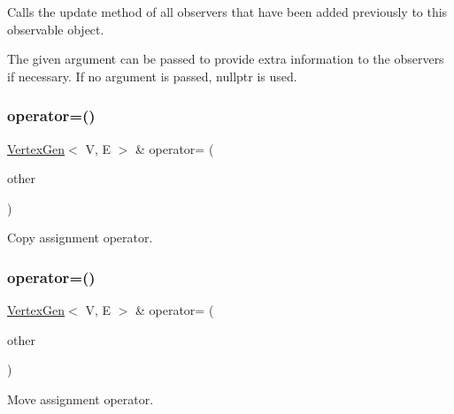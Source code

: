 Calls the update method of all observers that have been added previously to this observable object. 

The given argument can be passed to provide extra information to the observers if necessary. If no argument is passed, nullptr is used. \mbox{\label{classVertexGen_aa22afb123ae6fddef177390c73b90fd4}} 
\subsubsection{\texorpdfstring{operator=()}{operator=()}\hspace{0.1cm}{\footnotesize\ttfamily [1/2]}}
{\footnotesize\ttfamily \mbox{\hyperlink{classVertexGen}{Vertex\+Gen}}$<$ V, E $>$ \& operator= (\begin{DoxyParamCaption}\item[{const \mbox{\hyperlink{classVertexGen}{Vertex\+Gen}}$<$ V, E $>$ \&}]{other }\end{DoxyParamCaption})}



Copy assignment operator. 

\mbox{\label{classVertexGen_afa38659fe8bf4a66b0e3f7c4d37f347f}} 
\subsubsection{\texorpdfstring{operator=()}{operator=()}\hspace{0.1cm}{\footnotesize\ttfamily [2/2]}}
{\footnotesize\ttfamily \mbox{\hyperlink{classVertexGen}{Vertex\+Gen}}$<$ V, E $>$ \& operator= (\begin{DoxyParamCaption}\item[{\mbox{\hyperlink{classVertexGen}{Vertex\+Gen}}$<$ V, E $>$ \&\&}]{other }\end{DoxyParamCaption})}



Move assignment operator. 

\mbox{\label{classObservable_a2fbb493a74c7c4a7604326bffcd75dbd}} 
